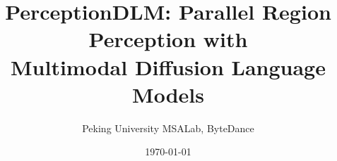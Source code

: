 \documentclass[]{bytedance}
\title{PerceptionDLM: Parallel Region Perception with \\ Multimodal Diffusion Language Models}
\author{
\centerline{
Peking University MSALab, ByteDance
}
}
\date{\today} \correspondence{\email{yhtong@pku.edu.cn, sunyang2533@gmail.com}}
\begin{document}
\maketitle









\clearpage



\clearpage

\beginappendix
\tableofcontents
\clearpage

\end{document}
